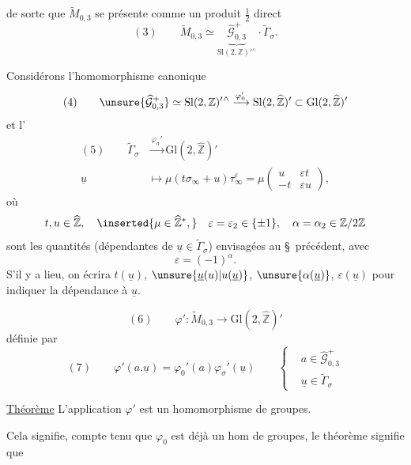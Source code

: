 
de sorte que $\widetilde M_{0,3}$ se présente comme un produit $\frac12$ direct
\[
(3)\qquad \widetilde M_{0,3}\simeq\underbrace{\widehat{\mathcal G}_{0,3}^{+}}_{\mathrm{Sl}(2,\mathbb Z)'{}^\wedge}\cdot\widetilde\Gamma_\sigma.
\]

Considérons l'homomorphisme canonique
\[
(4)\qquad \unsure{\widehat{\mathcal G}_{0,3}^{+}}\simeq\mathrm{Sl}(2,\mathbb Z)'{}^\wedge\xrightarrow{\varphi_0'}\mathrm{Sl}(2,\widehat{\mathbb Z})'\subset\mathrm{Gl}(2,\widehat{\mathbb Z})'
\]
et l'
\[
\begin{aligned}
(5)\qquad \widetilde\Gamma_\sigma&\xrightarrow{\varphi_\sigma'}\mathrm{Gl}(2,\widehat{\mathbb Z})'\\
\underline u&\longmapsto\mu(t\sigma_\infty+u)\tau_\infty^\varepsilon=\mu\begin{pmatrix}u&\varepsilon t\\-t&\varepsilon u\end{pmatrix},
\end{aligned}
\]
où 
\[
t,u\in\widehat{\mathbb Z},\quad\inserted{\mu\in\widehat{\mathbb Z}^{*},}\quad\varepsilon=\varepsilon_2\in\{\pm1\},\quad\alpha=\alpha_2\in\mathbb Z/2\mathbb Z
\]
sont les quantités (dépendantes de $\underline u\in\widetilde\Gamma_\sigma$) envisagées au \S\ précédent, avec
\[
\varepsilon=(-1)^\alpha.
\]
S'il y a lieu, on écrira $t(\underline u)$, $\unsure{\underline u(u)|u(\underline u)}$, $\unsure{\alpha(\underline u)}$, $\varepsilon(\underline u)$ pour indiquer la dépendance  à $\underline u$.

\[
(6)\qquad\varphi':\widetilde M_{0,3}\longrightarrow\mathrm{Gl}(2,\widehat{\mathbb Z})'
\]
définie par
\[
(7)\qquad\varphi'(a.\underline u)=\varphi_0'(a)\varphi_\sigma'(\underline u)\qquad\left\{\begin{aligned}&a\in\widehat{\mathcal G}_{0,3}^{+}\\&\underline u\in\widetilde\Gamma_\sigma\end{aligned}\right.
\]


\uline{Théorème} L'application $\varphi'$ est un homomorphisme de groupes.

Cela signifie, compte tenu que $\varphi_0$ est déjà un hom de groupes, le théorème signifie que

